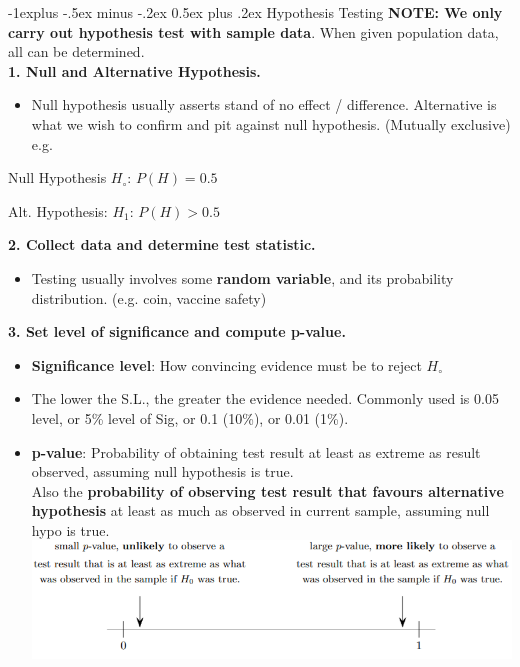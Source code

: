 \documentclass[10pt, landscape]{article}
\makeatletter
\renewcommand{\subsection}{\@startsection{subsection}{2}{0mm}%
                                {-1explus -.5ex minus -.2ex}%
                                {0.5ex plus .2ex}%
                                {\normalfont\normalsize\bfseries}}
\makeatother
\begin{document}
\begin{multicols*}{3}
\begin{itemize}
\end{itemize}

\subsection{Hypothesis Testing}
\textbf{NOTE: We only carry out hypothesis test with sample data}. When given population data, all can be determined. \\

	{\small \textbf{1. Null and Alternative Hypothesis.} \\}
\begin{itemize}
	\item Null hypothesis usually asserts stand of no effect / difference. Alternative is what we wish to confirm and pit against null hypothesis. (Mutually exclusive) e.g.
\end{itemize}
	\centerline{Null Hypothesis $H_\circ$: $P(H) = 0.5$}
	\centerline{Alt. Hypothesis: $H_1$: $P(H) > 0.5 $}

	{\small \textbf{2. Collect data and determine test statistic.} \\ } 
\begin{itemize} 
	\item Testing usually involves some \textbf{random variable}, and its probability distribution. (e.g. coin, vaccine safety)
\end{itemize}

	{\small \textbf{3. Set level of significance and compute p-value.} \\ }
	\begin{itemize}
	\item \textbf{Significance level}: How convincing evidence must be to reject $H_\circ$ 
	\item The lower the S.L., the greater the evidence needed. Commonly used is 0.05 level, or 5\% level of Sig, or 0.1 (10\%), or 0.01 (1\%).
	\item \textbf{p-value}: Probability of obtaining test result at least as extreme as result observed, assuming null hypothesis is true. \\
	Also the \textbf{probability of observing test result that favours alternative hypothesis} at least as much as observed in current sample, assuming null hypo is true.
	\includegraphics[width = \linewidth]{pvalue}
\end{itemize}



\end{multicols*}
\end{document}

